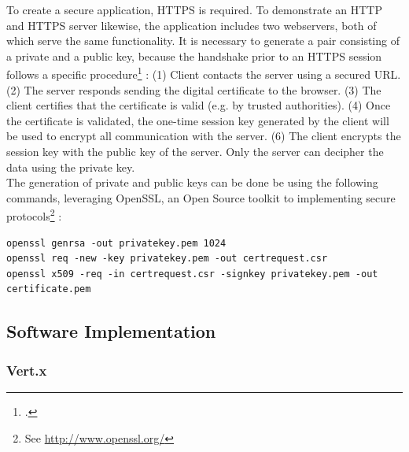 To create a secure application, HTTPS is required. To demonstrate an HTTP and HTTPS server likewise, the application includes two webservers, both of which serve the same functionality. It is necessary to generate a pair consisting of a private 
and a public key, because the handshake prior to an HTTPS session follows a specific procedure\footcite[Cf.]{Nemati_2011} :
 (1) Client contacts the server using a secured URL.
 (2) The server responds sending the digital certificate to the browser.
 (3) The client certifies that the certificate is valid (e.g. by trusted authorities).
 (4) Once the certificate is validated, the one-time session key generated by the client will be used to encrypt all communication with the server.
 (6) The client encrypts the session key with the public key of the server. Only the server can decipher the data using the private key.\\
The generation of private and public keys can be done be using the following commands, leveraging OpenSSL, an Open Source toolkit to implementing secure protocols\footnote{See \url{ http://www.openssl.org/}} :\\

\begin{lstlisting}[caption={Generating a new pair of public/private keys}]
openssl genrsa -out privatekey.pem 1024
openssl req -new -key privatekey.pem -out certrequest.csr 
openssl x509 -req -in certrequest.csr -signkey privatekey.pem -out certificate.pem
\end{lstlisting}


\FloatBarrier
\subsection{Software Implementation}
\label{software_implementation}

\subsubsection{Vert.x}
\label{implementation_vertx}

